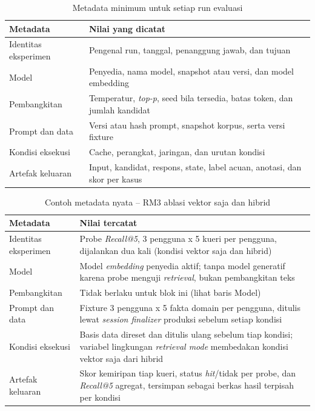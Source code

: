 \begin{table}[!htbp]
\centering
\caption{Metadata minimum untuk setiap run evaluasi}
{\footnotesize
\begin{tabularx}{\textwidth}{|>{\raggedright\arraybackslash}p{3.3cm}|>{\raggedright\arraybackslash}X|}
\hline
\rowcolor{tableheadgray}
\textbf{Metadata} & \textbf{Nilai yang dicatat} \\
\hline
Identitas eksperimen & Pengenal run, tanggal, penanggung jawab, dan tujuan \\
\hline
Model & Penyedia, nama model, snapshot atau versi, dan model embedding \\
\hline
Pembangkitan & Temperatur, \textit{top-p}, seed bila tersedia, batas token, dan jumlah kandidat \\
\hline
Prompt dan data & Versi atau hash prompt, snapshot korpus, serta versi fixture \\
\hline
Kondisi eksekusi & Cache, perangkat, jaringan, dan urutan kondisi \\
\hline
Artefak keluaran & Input, kandidat, respons, state, label acuan, anotasi, dan skor per kasus \\
\hline
\end{tabularx}
}
\end{table}

\begin{table}[!htbp]
\centering
\caption{Contoh metadata nyata -- RM3 ablasi vektor saja dan hibrid}
{\footnotesize
\begin{tabularx}{\textwidth}{|>{\raggedright\arraybackslash}p{3.3cm}|>{\raggedright\arraybackslash}X|}
\hline
\rowcolor{tableheadgray}
\textbf{Metadata} & \textbf{Nilai tercatat} \\
\hline
Identitas eksperimen & Probe \textit{Recall@5}, 3 pengguna x 5 kueri per pengguna, dijalankan dua kali (kondisi vektor saja dan hibrid) \\
\hline
Model & Model \textit{embedding} penyedia aktif; tanpa model generatif karena probe menguji \textit{retrieval}, bukan pembangkitan teks \\
\hline
Pembangkitan & Tidak berlaku untuk blok ini (lihat baris Model) \\
\hline
Prompt dan data & Fixture 3 pengguna x 5 fakta domain per pengguna, ditulis lewat \textit{session finalizer} produksi sebelum setiap kondisi \\
\hline
Kondisi eksekusi & Basis data direset dan ditulis ulang sebelum tiap kondisi; variabel lingkungan \textit{retrieval mode} membedakan kondisi vektor saja dari hibrid \\
\hline
Artefak keluaran & Skor kemiripan tiap kueri, status \textit{hit}/tidak per probe, dan \textit{Recall@5} agregat, tersimpan sebagai berkas hasil terpisah per kondisi \\
\hline
\end{tabularx}
}
\end{table}

